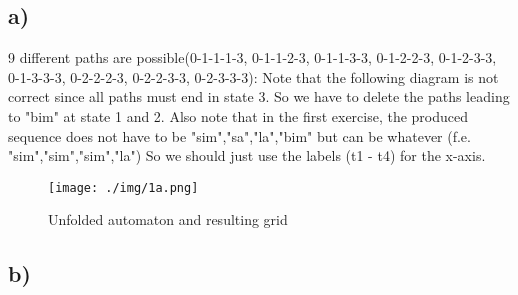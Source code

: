 \newpage

\subsection*{a)} %
9 different paths are possible(0-1-1-1-3, 0-1-1-2-3, 0-1-1-3-3, 0-1-2-2-3, 0-1-2-3-3, 0-1-3-3-3, 0-2-2-2-3, 0-2-2-3-3, 0-2-3-3-3):
Note that the following diagram is not correct since all paths must end in state 3. So we have to delete the paths leading to "bim" at state 1 and 2.
Also note that in the first exercise, the produced sequence does not have to be "sim","sa","la","bim" but can be whatever (f.e. "sim","sim","sim","la")
So we should just use the labels (t1 - t4) for the x-axis.
 
\label{sub:a}
\begin{figure}[h!]
	\centering
	\texttt{[image: ./img/1a.png]}
	\caption{Unfolded automaton and resulting grid}
\end{figure}



%
%
%
%


\subsection*{b)} %
\label{sub:b}

